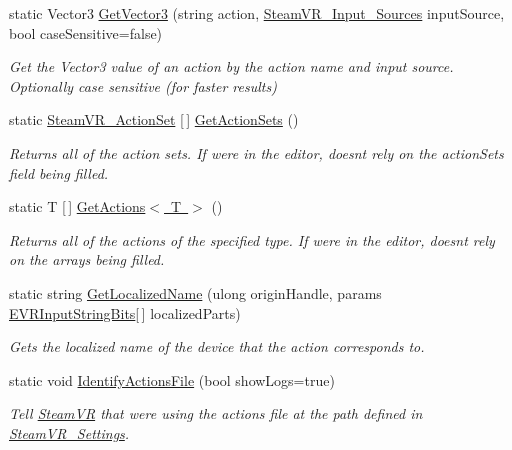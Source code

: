 \begin{DoxyCompactItemize}
static Vector3 \mbox{\hyperlink{class_valve_1_1_v_r_1_1_steam_v_r___input_a6faee3b08cec574fc440a2ecbbf6a7ad}{Get\+Vector3}} (string action, \mbox{\hyperlink{namespace_valve_1_1_v_r_a82e5bf501cc3aa155444ee3f0662853f}{Steam\+V\+R\+\_\+\+Input\+\_\+\+Sources}} input\+Source, bool case\+Sensitive=false)
\begin{DoxyCompactList}\small\item\em Get the Vector3 value of an action by the action name and input source. Optionally case sensitive (for faster results) \end{DoxyCompactList}\item 
static \mbox{\hyperlink{class_valve_1_1_v_r_1_1_steam_v_r___action_set}{Steam\+V\+R\+\_\+\+Action\+Set}} \mbox{[}$\,$\mbox{]} \mbox{\hyperlink{class_valve_1_1_v_r_1_1_steam_v_r___input_a936c76ec182f18ace45ad74c95ce7629}{Get\+Action\+Sets}} ()
\begin{DoxyCompactList}\small\item\em Returns all of the action sets. If we\textquotesingle{}re in the editor, doesn\textquotesingle{}t rely on the action\+Sets field being filled. \end{DoxyCompactList}\item 
static T \mbox{[}$\,$\mbox{]} \mbox{\hyperlink{class_valve_1_1_v_r_1_1_steam_v_r___input_a7a089fd07a7a18392f2e6b263a77ec96}{Get\+Actions$<$ T $>$}} ()
\begin{DoxyCompactList}\small\item\em Returns all of the actions of the specified type. If we\textquotesingle{}re in the editor, doesn\textquotesingle{}t rely on the arrays being filled. \end{DoxyCompactList}\item 
static string \mbox{\hyperlink{class_valve_1_1_v_r_1_1_steam_v_r___input_a108f58e0227aff15784fbc0a3bb94fe2}{Get\+Localized\+Name}} (ulong origin\+Handle, params \mbox{\hyperlink{namespace_valve_1_1_v_r_a05e76187bbc5846b9bfb44f6acf13912}{E\+V\+R\+Input\+String\+Bits}}\mbox{[}$\,$\mbox{]} localized\+Parts)
\begin{DoxyCompactList}\small\item\em Gets the localized name of the device that the action corresponds to. \end{DoxyCompactList}\item 
static void \mbox{\hyperlink{class_valve_1_1_v_r_1_1_steam_v_r___input_ac4a27fa036690fecc3a65422681c5703}{Identify\+Actions\+File}} (bool show\+Logs=true)
\begin{DoxyCompactList}\small\item\em Tell \mbox{\hyperlink{class_valve_1_1_v_r_1_1_steam_v_r}{Steam\+VR}} that we\textquotesingle{}re using the actions file at the path defined in \mbox{\hyperlink{class_valve_1_1_v_r_1_1_steam_v_r___settings}{Steam\+V\+R\+\_\+\+Settings}}. \end{DoxyCompactList}\item 

\end{DoxyCompactItemize}

